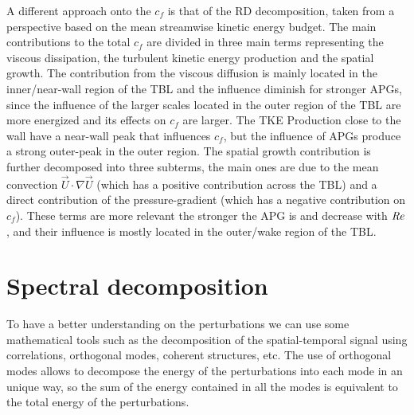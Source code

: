 A different approach onto the $c_f$ is that of the RD decomposition, taken from a perspective based on the mean streamwise kinetic energy budget. 
The main contributions to the total $c_f$ are divided in three main terms representing the viscous dissipation, the turbulent kinetic energy production and the spatial growth.
The contribution from the viscous diffusion is mainly located in the inner/near-wall region of the TBL and the influence diminish for stronger APGs, since the influence of the larger scales located in the outer region of the TBL are more energized and its effects on $c_f$ are larger.
The TKE Production close to the wall have a near-wall peak that influences $c_f$, but the influence of APGs produce a strong outer-peak in the outer region.
The spatial growth contribution is further decomposed into three subterms, the main ones are due to the mean convection $\Vec{U}\cdot \nabla\Vec{U}$ (which has a positive contribution across the TBL) and a direct contribution of the pressure-gradient (which has a negative contribution on $c_f$). These terms are more relevant the stronger the APG is and decrease with $\mbox{\textit{Re}}$, and their influence is mostly located in the outer/wake region of the TBL.


\section{Spectral decomposition}
To have a better understanding on the perturbations we can use some mathematical tools such as the decomposition of the spatial-temporal signal using correlations, orthogonal modes, coherent structures, etc.
The use of orthogonal modes allows to decompose the energy of the perturbations into each mode in an unique way, so the sum of the energy contained in all the modes is equivalent to the total energy of the perturbations. 

